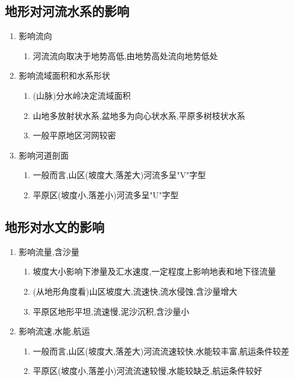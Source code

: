 \documentclass[a4paper]{article}
\begin{document}
    \subsection{地形对河流水系的影响}
    \begin{enumerate}
        \item 影响流向
        \begin{enumerate}
            \item 河流流向取决于地势高低,由地势高处流向地势低处
        \end{enumerate}
        \item 影响流域面积和水系形状
        \begin{enumerate}
            \item (山脉)分水岭决定流域面积
            \item 山地多放射状水系,盆地多为向心状水系,平原多树枝状水系
            \item 一般平原地区河网较密
        \end{enumerate}
        \item 影响河道剖面
        \begin{enumerate}
            \item 一般而言,山区(坡度大,落差大)河流多呈"V"字型
            \item 平原区(坡度小,落差小)河流多呈"U"字型
        \end{enumerate}
    \end{enumerate}
    \subsection{地形对水文的影响}
    \begin{enumerate}
        \item 影响流量,含沙量
        \begin{enumerate}
            \item 坡度大小影响下渗量及汇水速度,一定程度上影响地表和地下径流量
            \item (从地形角度看)山区坡度大,流速快,流水侵蚀,含沙量增大
            \item 平原区地形平坦,流速慢,泥沙沉积,含沙量小
        \end{enumerate}
        \item 影响流速,水能,航运
        \begin{enumerate}
            \item 一般而言,山区(坡度大,落差大)河流流速较快,水能较丰富,航运条件较差
            \item 平原区(坡度小,落差小)河流流速较慢,水能较缺乏,航运条件较好
        \end{enumerate}
    \end{enumerate}
\end{document}
